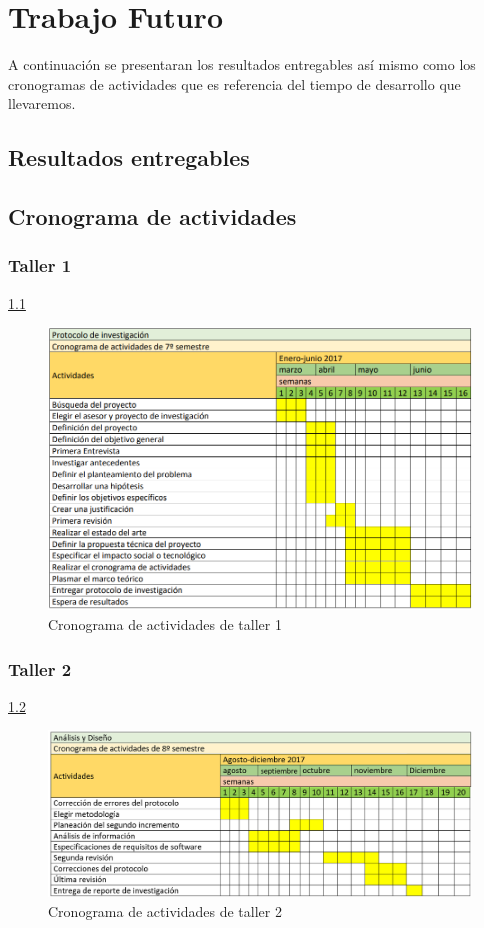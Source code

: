  \chapter{Trabajo Futuro}

A continuación se presentaran los resultados entregables así mismo como los cronogramas de actividades que es referencia del tiempo de desarrollo que llevaremos.

 \section{Resultados entregables}


\section{Cronograma de actividades}
    \subsection{Taller 1}\ref{Taller1}
    \begin{figure}[h]

      \centering
      \includegraphics[scale=.7]{lib/assets/cronograma-1}
      \caption{Cronograma de actividades de taller 1}
      \label{Taller1}
    \end{figure}

    \subsection{Taller 2}\ref{Taller2}

    \begin{figure}[h]
      \centering
      \includegraphics[scale=.7]{lib/assets/cronogramataller2}
      \caption{Cronograma de actividades de taller 2}
      \label{Taller2}
    \end{figure}


